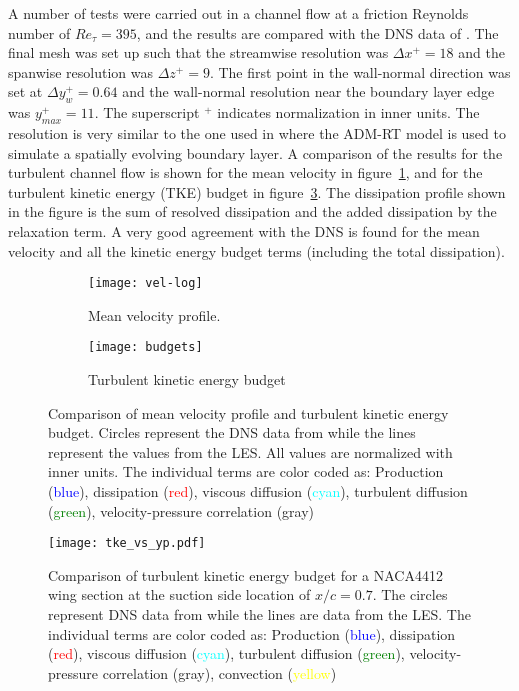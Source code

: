 A number of tests were carried out in a channel flow at a friction Reynolds number of $Re_{\tau}=395$, and the results are compared with the DNS data of \cite{moser99}. The final mesh was set up such that the streamwise resolution was $\Delta x^{+}=18$ and the spanwise resolution was $\Delta z^{+}=9$. The first point in the wall-normal direction was set at $\Delta y_{w}^{+}=0.64$ and the wall-normal resolution near the boundary layer edge was $y_{max}^{+}=11$. The superscript $^{+}$ indicates normalization in inner units. The resolution is very similar to the one used in \cite{eitel14} where the ADM-RT model is used to simulate a spatially evolving boundary layer. A comparison of the results for the turbulent channel flow is shown for the mean velocity in figure~\ref{fig:vel_mean}, and for the turbulent kinetic energy (TKE) budget in figure~\ref{fig:budget}. The dissipation profile shown in the figure is the sum of resolved dissipation and the added dissipation by the relaxation term. A very good agreement with the DNS is found for the mean velocity and all the kinetic energy budget terms (including the total dissipation).

\begin{figure}[h]
	\begin{subfigure}[t]{0.5\textwidth}
		\centering
		\texttt{[image: vel-log]}
		\caption{Mean velocity profile.}
		\label{fig:vel_mean}
	\end{subfigure}	
	\begin{subfigure}[t]{0.5\textwidth}
		\centering
		\texttt{[image: budgets]}
		\caption{Turbulent kinetic energy budget}
		\label{fig:budget}
	\end{subfigure}
	\caption{Comparison of mean velocity profile and turbulent kinetic energy budget. Circles represent the DNS data from \cite{moser99} while the lines represent the values from the LES. All values are normalized with inner units. The individual terms are color coded as: Production (\textcolor{blue}{blue}), dissipation (\textcolor{red}{red}), viscous diffusion (\textcolor{cyan}{cyan}), turbulent diffusion (\textcolor{green}{green}), velocity-pressure correlation (\textcolor{mygray}{gray})}
\end{figure}

\begin{figure}[h]
	\centering
	\texttt{[image: tke\_vs\_yp.pdf]}
	\caption{Comparison of turbulent kinetic energy budget for a NACA4412 wing section at the suction side location of $x/c=0.7$. The circles represent DNS data from \cite{hosseini16} while the lines are data from the LES. The individual terms are color coded as: Production (\textcolor{blue}{blue}), dissipation (\textcolor{red}{red}), viscous diffusion (\textcolor{cyan}{cyan}), turbulent diffusion (\textcolor{green}{green}), velocity-pressure correlation (\textcolor{mygray}{gray}), convection (\textcolor{yellow}{yellow})}
	\label{fig:wing_budget}
\end{figure}

